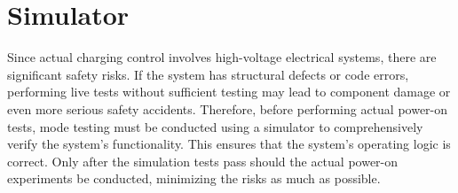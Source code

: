 \documentclass[
	english,
	ruledheaders=section,%
	class=report,%
	thesis={type=Report},%
	accentcolor=9c,%
	custommargins=true,%
	marginpar=false,%
	parskip=half-,%
	fontsize=11pt,%
	logofile={img/tuda_logo.pdf}, %
]{tudapub}
\begin{document}
\section{Simulator}
\label{sec:Simulator}
Since actual charging control involves high-voltage electrical systems, there are significant safety risks. If the system has structural defects or code errors, performing live tests without sufficient testing may lead to component damage or even more serious safety accidents. Therefore, before performing actual power-on tests, mode testing must be conducted using a simulator to comprehensively verify the system's functionality. This ensures that the system's operating logic is correct. Only after the simulation tests pass should the actual power-on experiments be conducted, minimizing the risks as much as possible.



    

\end{document}
